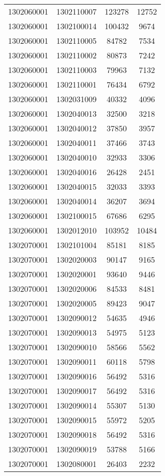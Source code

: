 \begin{longtable}[h]{llcc}
		1302060001 & 1302110007 & 123278 & 12752\\
		1302060001 & 1302100014 & 100432 & 9674\\
		1302060001 & 1302110005 & 84782 & 7534\\
		1302060001 & 1302110002 & 80873 & 7242\\
		1302060001 & 1302110003 & 79963 & 7132\\
		1302060001 & 1302110001 & 76434 & 6792\\
		1302060001 & 1302031009 & 40332 & 4096\\
		1302060001 & 1302040013 & 32500 & 3218\\
		1302060001 & 1302040012 & 37850 & 3957\\
		1302060001 & 1302040011 & 37466 & 3743\\
		1302060001 & 1302040010 & 32933 & 3306\\
		1302060001 & 1302040016 & 26428 & 2451\\
		1302060001 & 1302040015 & 32033 & 3393\\
		1302060001 & 1302040014 & 36207 & 3694\\
		1302060001 & 1302100015 & 67686 & 6295\\
		1302060001 & 1302012010 & 103952 & 10484\\
		1302070001 & 1302101004 & 85181 & 8185\\
		1302070001 & 1302020003 & 90147 & 9165\\
		1302070001 & 1302020001 & 93640 & 9446\\
		1302070001 & 1302020006 & 84533 & 8481\\
		1302070001 & 1302020005 & 89423 & 9047\\
		1302070001 & 1302090012 & 54635 & 4946\\
		1302070001 & 1302090013 & 54975 & 5123\\
		1302070001 & 1302090010 & 58566 & 5562\\
		1302070001 & 1302090011 & 60118 & 5798\\
		1302070001 & 1302090016 & 56492 & 5316\\
		1302070001 & 1302090017 & 56492 & 5316\\
		1302070001 & 1302090014 & 55307 & 5130\\
		1302070001 & 1302090015 & 55972 & 5205\\
		1302070001 & 1302090018 & 56492 & 5316\\
		1302070001 & 1302090019 & 53788 & 5166\\
		1302070001 & 1302080001 & 26403 & 2232\\

\end{longtable}

